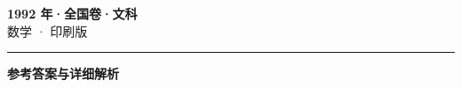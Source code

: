 \documentclass[zihao=5, a4paper]{ctexart}
\begin{document}
\begin{center}
  {\Large\bfseries 1992 年·全国卷·文科}\\[4pt]
  {\large 数学 · 印刷版}
\end{center}
\medskip
{}

\par\bigskip\hrule\bigskip
{}
\begin{center}{\large\bfseries 参考答案与详细解析}\end{center}
\smallskip

\end{document}
